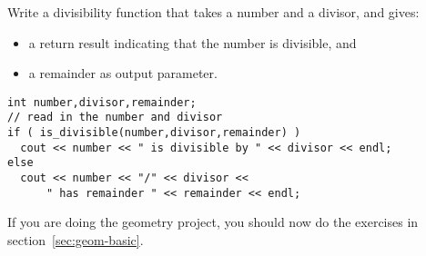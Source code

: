 \begin{exercise}
  \label{ex:div-remain}
  Write a divisibility function that takes a number and a divisor, and gives:
  \begin{itemize}
  \item a  return result indicating that the number is
    divisible, and
  \item a remainder as output parameter.
  \end{itemize}

{\small
\begin{lstlisting}
int number,divisor,remainder;
// read in the number and divisor
if ( is_divisible(number,divisor,remainder) )
  cout << number << " is divisible by " << divisor << endl;
else
  cout << number << "/" << divisor <<
      " has remainder " << remainder << endl;
\end{lstlisting}
}
\end{exercise}

\begin{exercise}
  If you are doing the geometry project, you should now do the exercises
  in section~\ref{sec:geom-basic}.
\end{exercise}

\endinput

\begin{block}{Const parameters}
  \label{sl:pass-constref}
  You can prevent local changes to the function parameter:

  \verbatimsnippet{readonlyparm}

  This is mostly to protect you against yourself.\\
  Const ref has no overhead, no danger of changes:

  \verbatimsnippet{constrefarray}
\end{block}

